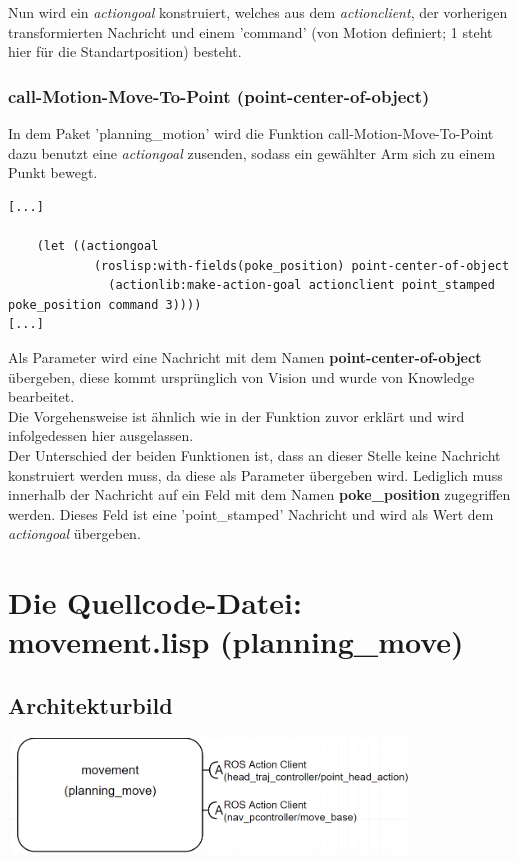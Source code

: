\documentclass{suturo}
\begin{document}
Nun wird ein \textit{actiongoal} konstruiert, welches aus dem \textit{actionclient}, der vorherigen transformierten Nachricht und einem 'command' (von Motion definiert; 1 steht hier für die Standartposition) besteht.

\subsubsection{call-Motion-Move-To-Point (point-center-of-object)}

In dem Paket 'planning\_motion' wird die Funktion call-Motion-Move-To-Point dazu benutzt eine \textit{actiongoal} zusenden, sodass ein gewählter Arm sich zu einem Punkt bewegt.

\noindent
\begin{minipage}{\linewidth}
 
\lstset{language=PHP}
\begin{lstlisting}
[...]

    (let ((actiongoal
            (roslisp:with-fields(poke_position) point-center-of-object
              (actionlib:make-action-goal actionclient point_stamped poke_position command 3))))
[...]

\end{lstlisting}
\end{minipage}


Als Parameter wird eine Nachricht mit dem Namen \textbf{point-center-of-object} übergeben, diese kommt ursprünglich von Vision und wurde von Knowledge bearbeitet.\\
 Die Vorgehensweise ist ähnlich wie in der Funktion zuvor erklärt und wird infolgedessen hier ausgelassen.\\

 Der Unterschied der beiden Funktionen ist, dass an dieser Stelle keine Nachricht konstruiert werden muss, da diese als Parameter übergeben wird. Lediglich muss innerhalb der Nachricht auf ein Feld mit dem Namen \textbf{poke\_position} zugegriffen werden. Dieses Feld ist eine 'point\_stamped' Nachricht und wird als Wert dem \textit{actiongoal} übergeben.



\section{Die Quellcode-Datei: movement.lisp (planning\_move)}
\subsection{Architekturbild}
\begin{center} \includegraphics[width=0.8\textwidth]{img/diag_planning_move.png} \end{center}
\end{document}
